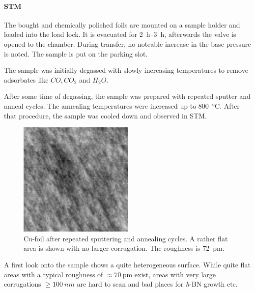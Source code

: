 \paragraph{STM}
The bought and chemically polished foils are mounted on a sample holder and loaded into the load lock. It is evacuated for \SIrange{2}{3}{\hour}, afterwards the valve is opened to the chamber. During transfer, no noteable increase in the base pressure is noted. The sample is put on the parking slot.

The sample was initially degassed with slowly increasing temperatures to remove adsorbates like $CO, CO_2$ and $H_2O$.

After some time of degassing, the sample was prepared with repeated sputter and anneal cycles. The annealing temperatures were increased up to \SI{800}{\degreeCelsius}. 
After that procedure, the sample was cooled down and observed in STM.

\begin{figure}[]
	\centering
	\includegraphics[width=0.5\textwidth]{./images/F150331-125720.jpg}
	\caption{Cu-foil after repeated sputtering and annealing cycles. A rather flat area is shown with no larger corrugation. The roughness is \SI{72}{\pico\meter}.}
	\label{fig:cu-foil-clean}
\end{figure}

A first look onto the sample shows a quite heterogeneous surface. While quite flat areas with a typical roughness of $\approx \SI{70}{\pico\meter}$ exist, areas with very large corrugations $\geq \SI{100}{nm}$ are hard to scan and bad places for \textit{h}-BN growth etc.